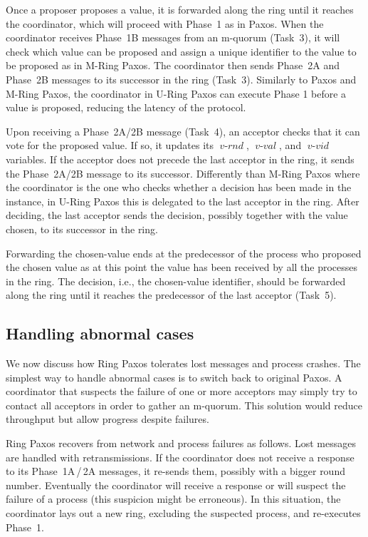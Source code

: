 \documentclass[final,3p,times,twocolumn,authoryear]{elsarticle}
\newcommand{\mv}[1]{\ensuremath{\operatorname{\mathit{#1}}}}
\begin{document}
Once a proposer proposes a value, it is forwarded along the ring until it reaches the coordinator, which will proceed with Phase~1 as in Paxos. When the coordinator receives Phase~1B messages from an m-quorum (Task~3), it will check which value can be proposed and assign a unique identifier to the value to be proposed as in M-Ring Paxos. The coordinator then sends Phase~2A and Phase~2B messages to its successor in the ring (Task~3).
Similarly to Paxos and M-Ring Paxos, the coordinator in U-Ring Paxos can execute Phase 1 before a value is proposed, reducing the latency of the protocol.

Upon receiving a Phase~2A/2B message (Task~4), an acceptor checks that it can vote for the proposed value. If so, it updates its \mv{v-rnd}, \mv{v-val}, and \mv{v-vid} variables. If the acceptor does not precede the last acceptor in the ring, it sends the Phase~2A/2B message to its successor.
Differently than M-Ring Paxos where the coordinator is the one who checks whether a decision has been made in the instance, in U-Ring Paxos this is delegated to the last acceptor in the ring. After deciding, the last acceptor sends the decision, possibly together with the value chosen, to its successor in the ring.

Forwarding the chosen-value ends at the predecessor of the process who proposed the chosen value as at this point the value has been received by all the processes in the ring.
The decision, i.e., the chosen-value identifier, should be forwarded along the ring until it reaches the predecessor of the last acceptor (Task~5). 

\subsection{Handling abnormal cases}
\label{sec:handlingfail}

We now discuss how Ring Paxos tolerates lost messages and process crashes. The simplest way to handle abnormal cases is to switch back to original Paxos. A coordinator that suspects the failure of one or more acceptors may simply try to contact all acceptors in order to gather an m-quorum. This solution would reduce throughput but allow progress despite failures. 

Ring Paxos recovers from network and process failures as follows. Lost messages are handled with retransmissions. If the coordinator does not receive a response to its Phase~1A\,/\,2A messages, it re-sends them, possibly with a bigger round number. Eventually the coordinator will receive a response or will suspect the failure of a process (this suspicion might be erroneous). In this situation, the coordinator  lays out a new ring, excluding the suspected process, and re-executes Phase~1. 
\end{document}
